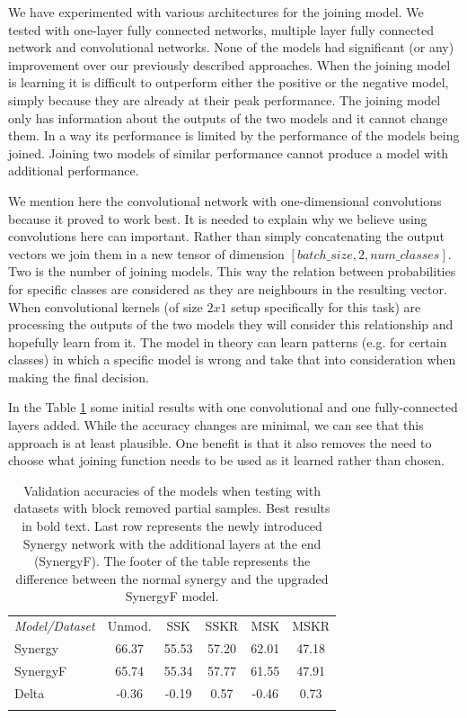 \documentclass[b5paper]{book}
\begin{document}
We have experimented with various architectures for the joining model. We tested with one-layer fully connected networks, multiple layer fully connected network and convolutional networks. None of the models had significant (or any) improvement over our previously described approaches. When the joining model is learning it is difficult to outperform either the positive or the negative model, simply because they are already at their peak performance. The joining model only has information about the outputs of the two models and it cannot change them. In a way its performance is limited by the performance of the models being joined. Joining two models of similar performance cannot produce a model with additional performance.

We mention here the convolutional network with one-dimensional convolutions because it proved to work best. It is needed to explain why we believe using convolutions here can important. Rather than simply concatenating the output vectors we join them in a new tensor of dimension \( [batch\_size, 2, num\_classes] \). Two is the number of joining models. This way the relation between probabilities for specific classes are considered as they are neighbours in the resulting vector. When convolutional kernels (of size \( 2 x 1 \) setup specifically for this task) are processing the outputs of the two models they will consider this relationship and hopefully learn from it. The model in theory can learn patterns (e.g. for certain classes) in which a specific model is wrong and take that into consideration when making the final decision. 

In the Table \ref{tab:synergyfc} some initial results with one convolutional and one fully-connected layers added. While the accuracy changes are minimal, we can see that this approach is at least plausible. One benefit is that it also removes the need to choose what joining function needs to be used as it learned rather than chosen.

\begin{table}
\centering
\caption{Validation accuracies of the models when testing with datasets with block removed partial samples. Best results in bold text. Last row represents the newly introduced Synergy network with the additional layers at the end (SynergyF). The footer of the table represents the difference between the normal synergy and the upgraded SynergyF model.}
\label{tab:synergyfc}
\tabcolsep=0.06cm
\begin{tabular}{lccccc}
\hline\noalign{\smallskip}
\emph{Model/Dataset} & Unmod. & SSK & SSKR & MSK & MSKR \\
\noalign{\smallskip}\hline\noalign{\smallskip}
Synergy & 66.37 & 55.53 & 57.20 & 62.01 & 47.18 \\
SynergyF & 65.74 & 55.34 & 57.77 & 61.55 & 47.91 \\
\noalign{\smallskip}\hline
Delta & -0.36 & -0.19 & 0.57 & -0.46 & 0.73 \\
\hline\noalign{\smallskip}
\end{tabular}
\end{table}
\end{document}
